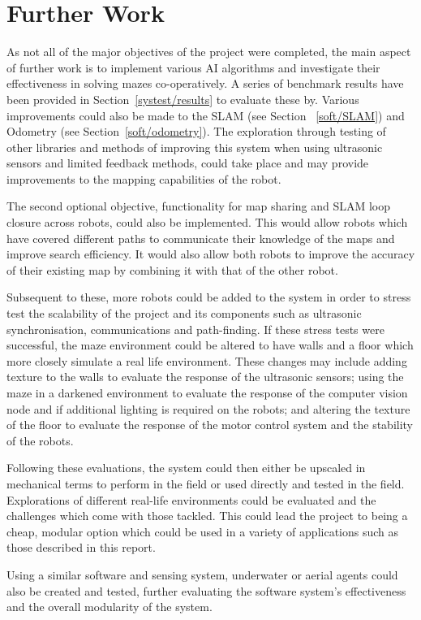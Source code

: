 
\chapter{Further Work}\label{furtherwork}
As not all of the major objectives of the project were completed, the main 
aspect of further work is to implement various AI algorithms and investigate 
their effectiveness in solving mazes co-operatively. A series of benchmark 
results have been provided in Section~\ref{systest/results} to evaluate 
these by. Various improvements could also be made to the SLAM (see Section~
\ref{soft/SLAM}) and Odometry (see Section~\ref{soft/odometry}). The exploration through testing of other 
libraries and methods of improving this system when using ultrasonic sensors 
and limited feedback methods, could take place and may provide improvements 
to the mapping capabilities of the robot. 

The second optional objective, functionality for map sharing and SLAM loop closure 
across robots, could also be implemented. This would allow robots which have covered 
different paths to communicate their knowledge of the maps and improve search 
efficiency. It would also allow both robots to improve the accuracy of their existing 
map by combining it with that of the other robot. 

Subsequent to these, more robots could be added to the system in order to 
stress test the scalability of the 
project and its components such as ultrasonic synchronisation, 
communications and path-finding. If these stress tests were successful, 
the maze environment could be altered to have walls and a floor which more 
closely simulate a real life environment. These changes may include adding 
texture to the walls to evaluate the response of the ultrasonic sensors; 
using the maze in a darkened environment to evaluate the response of the 
computer vision node and if additional lighting is required on the robots; 
and altering the texture of the floor to evaluate the response of the motor 
control system and the stability of the robots. 

Following these evaluations, the system could then either be upscaled in 
mechanical terms to perform in the field or used directly and tested in the 
field. Explorations of different real-life environments could be evaluated 
and the challenges which come with those tackled. This could lead the 
project to being a cheap, modular option which could be used in a variety of 
applications such as those described in this report. 

Using a similar software and sensing system, underwater or aerial agents 
could also be created and tested, further evaluating the software system's 
effectiveness and the overall modularity of the system. 